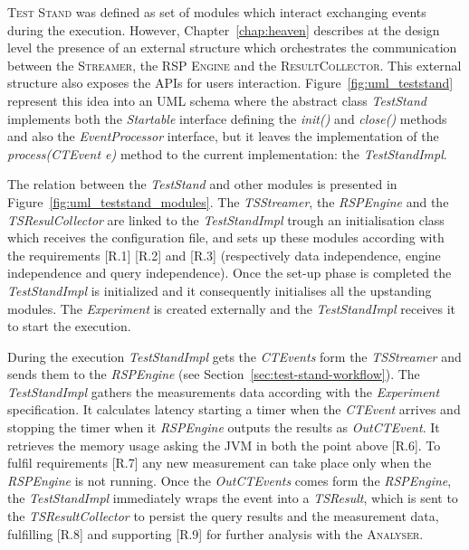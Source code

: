 \noindent \name \textsc{Test Stand} was defined as set of modules which interact exchanging events during the execution. However, Chapter~\ref{chap:heaven} describes at the design level the presence of an external structure which orchestrates the communication between the \textsc{Streamer}, the \textsc{RSP Engine} and the \textsc{ResultCollector}. This external structure also exposes the APIs for users interaction. Figure~\ref{fig:uml_teststand} represent this idea into an UML schema where the abstract class \textit{TestStand} implements both the \textit{Startable} interface  defining the \textit{init()} and \textit{close()} methods and also the \textit{EventProcessor} interface, but it leaves the implementation of the \textit{process(CTEvent e)} method to the current implementation: the \textit{TestStandImpl}. 

The relation between the \textit{TestStand} and other modules is presented in Figure~\ref{fig:uml_teststand_modules}. The \textit{TSStreamer}, the \textit{RSPEngine} and the \textit{TSResulCollector} are linked to the \textit{TestStandImpl} trough an initialisation class which receives the configuration file, and sets up these modules according with the requirements [R.1]  [R.2] and [R.3] (respectively data independence, engine independence and query independence). Once the set-up phase is completed the \textit{TestStandImpl} is initialized and it consequently initialises all the upstanding modules. The \textit{Experiment} is created externally and  the \textit{TestStandImpl} receives it to start the execution. 

During the execution \textit{TestStandImpl} gets the \textit{CTEvents} form the \textit{TSStreamer} and sends them to the \textit{RSPEngine} (see Section~\ref{sec:test-stand-workflow}). The \textit{TestStandImpl} gathers the measurements data according with the \textit{Experiment} specification. It calculates latency starting a timer when the \textit{CTEvent} arrives and stopping the timer when it \textit{RSPEngine} outputs the results as \textit{OutCTEvent}. It retrieves the memory usage asking the JVM in both the point above [R.6]. To fulfil requirements [R.7] any new measurement can take place only when the \textit{RSPEngine} is not running. Once the \textit{OutCTEvents} comes form the \textit{RSPEngine}, the \textit{TestStandImpl} immediately wraps the event into a \textit{TSResult}, which is sent to the \textit{TSResultCollector} to persist the query results and the measurement data, fulfilling [R.8] and supporting [R.9] for further analysis with the \textsc{Analyser}.


